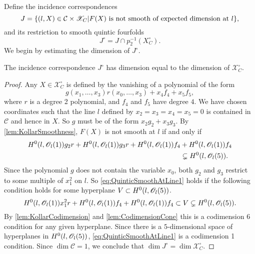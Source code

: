 Define the incidence correspondences
\[ J = \lbrace(l,X) \in \mathcal{C} \times \mathscr{X}_C \vert F(X) \text{ is not smooth of expected dimension at } l \rbrace, \]
and its restriction to smooth quintic fourfolds
\[J^\circ = J \cap p_2^{-1}(X_C^\circ). \]
We begin by estimating the dimension of $J^\circ$.
\begin{proposition}
  \label{prop:QuinticExpectedDimension}
  The incidence correspondence $J^\circ$ has dimension equal to the dimension of $\mathscr{X}^\circ_C$.
\end{proposition}
\begin{proof}
Any $X \in \mathscr{X}_C^\circ$ is defined by the vanishing of a polynomial of the form
\begin{equation}
  \label{eq:QuinticConeForm}
  g(x_1,\dots,x_3)r(x_0,\dots,x_3) + x_4 f_4 + x_5f_5,
\end{equation}
where $r$ is a degree 2 polynomial, and $f_4$ and $f_5$ have degree $4$. We have chosen coordinates such that the line $l$ defined by $x_2 = x_3 = x_4 = x_5 = 0$ is contained in $\mathcal{C}$ and hence in $X$. So $g$ must be of the form $x_2g_2 + x_3g_3$. By \cref{lem:KollarSmoothness}, $F(X)$ is not smooth at $l$ if and only if
\begin{align}
  \label{eq:QuinticSmoothAtLine1}
  H^0(l,\mathscr{O}_l(1))g_2r + H^0(l,\mathscr{O}_l(1))g_3r + H^0(l,\mathscr{O}_l(1))f_4 &+ H^0(l,\mathscr{O}_l(1))f_4 \nonumber \\ &\subsetneq H^0(l,\mathscr{O}_l(5)).
\end{align}
Since the polynomial $g$ does not contain the variable $x_0$, both $g_2$ and $g_3$ restrict to some multiple of $x_1^2$ on $l$. So \eqref{eq:QuinticSmoothAtLine1} holds if the following condition holds for some hyperplane $V \subset H^0(l,\mathscr{O}_l(5))$.
\begin{equation}
  \label{eq:QuinticSmoothAtLine2}
  H^0(l,\mathscr{O}_l(1))x_1^2r + H^0(l,\mathscr{O}_l(1))f_4 + H^0(l,\mathscr{O}_l(1))f_4 \subset V \subsetneq H^0(l,\mathscr{O}_l(5)).
\end{equation}
By \cref{lem:KollarCodimension} and \cref{lem:CodimensionCone} this is a codimension 6 condition for any given hyperplane. Since there is a $5$-dimensional space of hyperplanes in $H^0(l,\mathscr{O}_l(5))$, \eqref{eq:QuinticSmoothAtLine1} is a codimension 1 condition. Since $\dim \mathcal{C} = 1$, we conclude that $\dim J^\circ = \dim \mathscr{X}_C^\circ$.  
\end{proof}


